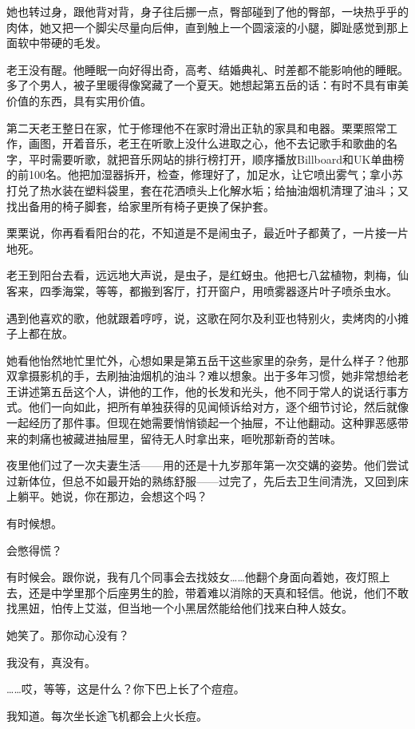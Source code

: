 \documentclass[lang=cn,newtx,12pt,scheme=chinese]{elegantbook}
\begin{document}
她也转过身，跟他背对背，身子往后挪一点，臀部碰到了他的臀部，一块热乎乎的肉体，她又把一个脚尖尽量向后伸，直到触上一个圆滚滚的小腿，脚趾感觉到那上面软中带硬的毛发。

老王没有醒。他睡眠一向好得出奇，高考、结婚典礼、时差都不能影响他的睡眠。多了个男人，被子里暖得像窝藏了一个夏天。她想起第五岳的话：有时不具有审美价值的东西，具有实用价值。

第二天老王整日在家，忙于修理他不在家时滑出正轨的家具和电器。栗栗照常工作，画图，开着音乐，老王在听歌上没什么进取之心，他不去记歌手和歌曲的名字，平时需要听歌，就把音乐网站的排行榜打开，顺序播放Billboard和UK单曲榜的前100名。他把加湿器拆开，检查，修理好了，加足水，让它喷出雾气；拿小苏打兑了热水装在塑料袋里，套在花洒喷头上化解水垢；给抽油烟机清理了油斗；又找出备用的椅子脚套，给家里所有椅子更换了保护套。

栗栗说，你再看看阳台的花，不知道是不是闹虫子，最近叶子都黄了，一片接一片地死。

老王到阳台去看，远远地大声说，是虫子，是红蚜虫。他把七八盆植物，刺梅，仙客来，四季海棠，等等，都搬到客厅，打开窗户，用喷雾器逐片叶子喷杀虫水。

遇到他喜欢的歌，他就跟着哼哼，说，这歌在阿尔及利亚也特别火，卖烤肉的小摊子上都在放。

她看他怡然地忙里忙外，心想如果是第五岳干这些家里的杂务，是什么样子？他那双拿摄影机的手，去刷抽油烟机的油斗？难以想象。出于多年习惯，她非常想给老王讲述第五岳这个人，讲他的工作，他的长发和光头，他不同于常人的说话行事方式。他们一向如此，把所有单独获得的见闻倾诉给对方，逐个细节讨论，然后就像一起经历了那件事。但现在她需要悄悄锁起一个抽屉，不让他翻动。这种罪恶感带来的刺痛也被藏进抽屉里，留待无人时拿出来，咂吮那新奇的苦味。

夜里他们过了一次夫妻生活——用的还是十九岁那年第一次交媾的姿势。他们尝试过新体位，但总不如最开始的熟练舒服——过完了，先后去卫生间清洗，又回到床上躺平。她说，你在那边，会想这个吗？

有时候想。

会憋得慌？

有时候会。跟你说，我有几个同事会去找妓女……他翻个身面向着她，夜灯照上去，还是中学里那个后座男生的脸，带着难以消除的天真和轻信。他说，他们不敢找黑妞，怕传上艾滋，但当地一个小黑居然能给他们找来白种人妓女。

她笑了。那你动心没有？

我没有，真没有。

……哎，等等，这是什么？你下巴上长了个痘痘。

我知道。每次坐长途飞机都会上火长痘。
\end{document}
